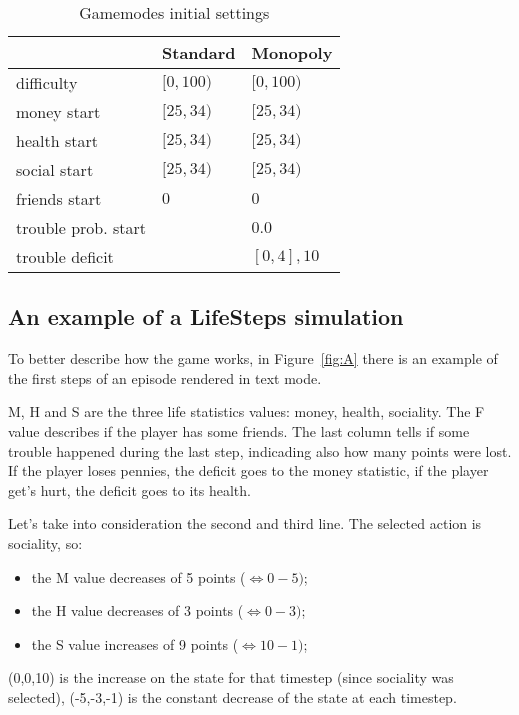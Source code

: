 \documentclass{article}
\begin{document}
\begin{table}
  \caption{Gamemodes initial settings}
  \label{gm_start}
  \centering
  \begin{tabular}{lll}
    \toprule
    & Standard     & Monopoly                               \\
    \midrule
    difficulty              & \([0,100)\)   & \([0,100)\)   \\
    money start             & \([25,34)\)   & \([25,34)\)   \\
    health start            & \([25,34)\)   & \([25,34)\)   \\
    social start            & \([25,34)\)   & \([25,34)\)   \\
    friends start           & \(0\)         & \(0\)         \\
    trouble prob. start     &               & \(0.0\)       \\
    trouble deficit         &               & \([0,4],10\)      \\
    \bottomrule
  \end{tabular}
\end{table}

\subsection{An example of a LifeSteps simulation}

To better describe how the game works, in Figure~\ref{fig:A} there is an example of the first steps of an episode rendered in text mode.

M, H and S are the three life statistics values: money, health, sociality. The F value describes if the player has some friends. The last column tells if some trouble happened during the last step, indicading also how many points were lost. If the player loses pennies, the deficit goes to the money statistic, if the player get's hurt, the deficit goes to its health.

Let's take into consideration the second and third line. The selected action is sociality, so:
\begin{itemize}
    \item the M value decreases of 5 points (\(\Leftrightarrow 0-5)\);
    \item the H value decreases of 3 points (\(\Leftrightarrow 0-3)\);
    \item the S value increases of 9 points (\(\Leftrightarrow 10-1)\);
\end{itemize}
(0,0,10) is the increase on the state for that timestep (since sociality was selected), (-5,-3,-1) is the constant decrease of the state at each timestep.
\end{document}
